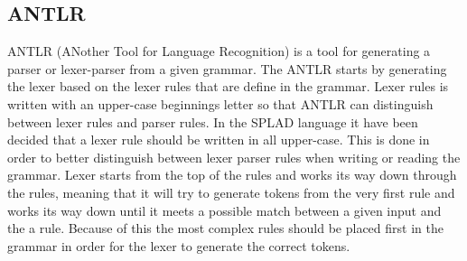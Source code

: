 \subsection{ANTLR}
ANTLR (ANother Tool for Language Recognition) is a tool for generating a parser or lexer-parser from a given grammar. The ANTLR starts by generating the lexer based on the lexer rules that are define in the grammar. Lexer rules is written with an upper-case beginnings letter so that ANTLR can distinguish between lexer rules and parser rules.
In the SPLAD language it have been decided that a lexer rule should be written in all upper-case. This is done in order to better distinguish between lexer parser rules when writing or reading the grammar. Lexer starts from the top of the rules and works its way down through the rules, meaning that it will try to generate tokens from the very first rule and works its way down until it meets a possible match between a given input and the a rule. Because of this the most complex rules should be placed first in the grammar in order for the lexer to generate the correct tokens. 
